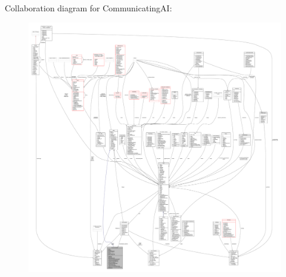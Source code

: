 Collaboration diagram for Communicating\+AI\+:
\nopagebreak
\begin{figure}[H]
\begin{center}
\leavevmode
\includegraphics[width=350pt]{d1/dfc/classCommunicatingAI__coll__graph}
\end{center}
\end{figure}
